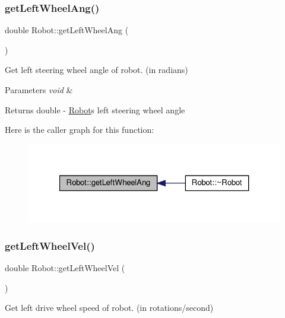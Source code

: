 \subsubsection{\texorpdfstring{get\+Left\+Wheel\+Ang()}{getLeftWheelAng()}}
{\footnotesize\ttfamily double Robot\+::get\+Left\+Wheel\+Ang (\begin{DoxyParamCaption}{ }\end{DoxyParamCaption})}



Get left steering wheel angle of robot. (in radians) 


\begin{DoxyParams}{Parameters}
{\em void} & \\
\hline
\end{DoxyParams}
\begin{DoxyReturn}{Returns}
double -\/ \hyperlink{classRobot}{Robot}\textquotesingle{}s left steering wheel angle 
\end{DoxyReturn}
Here is the caller graph for this function\+:
\nopagebreak
\begin{figure}[H]
\begin{center}
\leavevmode
\includegraphics[width=321pt]{classRobot_a3e230967bf4b167aaa20d442c6c5ceb0_icgraph}
\end{center}
\end{figure}
\mbox{\label{classRobot_a99559e14e93539d1deaf5f0405dfce76}} 
\subsubsection{\texorpdfstring{get\+Left\+Wheel\+Vel()}{getLeftWheelVel()}}
{\footnotesize\ttfamily double Robot\+::get\+Left\+Wheel\+Vel (\begin{DoxyParamCaption}{ }\end{DoxyParamCaption})}



Get left drive wheel speed of robot. (in rotations/second) 


